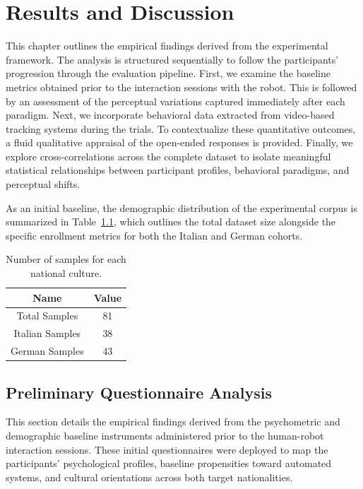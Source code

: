 \chapter{Results and Discussion}
\label{sec:res_and_disc}

\ifpdf
    \graphicspath{{Chapter9/Figs/Raster/}{Chapter9/Figs/PDF/}{Chapter9/Figs/}}
\else
    \graphicspath{{Chapter9/Figs/Vector/}{Chapter9/Figs/}}
\fi
This chapter outlines the empirical findings derived from the experimental framework. 
The analysis is structured sequentially to follow the participants' progression through the evaluation pipeline. 
First, we examine the baseline metrics obtained prior to the interaction sessions with the robot. 
This is followed by an assessment of the perceptual variations captured immediately after each paradigm. 
Next, we incorporate behavioral data extracted from video-based tracking systems during the trials. 
To contextualize these quantitative outcomes, a fluid qualitative appraisal of the open-ended responses is provided. 
Finally, we explore cross-correlations across the complete dataset to isolate meaningful statistical relationships between participant profiles, behavioral paradigms, and perceptual shifts.

As an initial baseline, the demographic distribution of the experimental corpus is summarized in Table~\ref{ch9:tab:metadata}, which outlines the total dataset size alongside the specific enrollment metrics for both the Italian and German cohorts.
\begin{table}[]
    \centering
    \begin{tabular}{|c|c|}
    \hline
       \textbf{Name}  & \textbf{Value} \\
       \hline
        Total Samples & 81 \\
        \hline
        Italian Samples & 38 \\
        \hline
        German Samples & 43 \\
        \hline
    \end{tabular}
    \caption{Number of samples for each national culture.}
    \label{ch9:tab:metadata}
\end{table}

\section{Preliminary Questionnaire Analysis}
This section details the empirical findings derived from the psychometric and demographic baseline instruments administered prior to the human-robot interaction sessions. 
These initial questionnaires were deployed to map the participants' psychological profiles, baseline propensities toward automated systems, and cultural orientations across both target nationalities.

